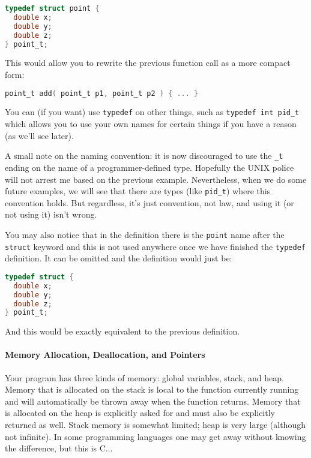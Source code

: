 \begin{lstlisting}[language=C]
typedef struct point {
  double x;
  double y;
  double z;
} point_t;
\end{lstlisting}

This would allow you to rewrite the previous function call as a more compact form:

\begin{lstlisting}[language=C]
point_t add( point_t p1, point_t p2 ) { ... }
\end{lstlisting}

You can (if you want) use \texttt{typedef} on other things, such as \texttt{typedef int pid\_t} which allows you to use your own names for certain things if you have a reason (as we'll see later).

A small note on the naming convention: it is now discouraged to use the \texttt{\_t} ending on the name of a programmer-defined type. Hopefully the UNIX police will not arrest me based on the previous example. Nevertheless, when we do some future examples, we will see that there are types (like \texttt{pid\_t}) where this convention holds. But regardless, it's just convention, not law, and using it (or not using it) isn't wrong.

You may also notice that in the definition there is the \texttt{point} name after the \texttt{struct} keyword and this is not used anywhere once we have finished the \texttt{typedef} definition. It can be omitted and the definition would just be:

\begin{lstlisting}[language=C]
typedef struct {
  double x;
  double y;
  double z;
} point_t;
\end{lstlisting}

And this would be exactly equivalent to the previous definition.

\paragraph{Memory Allocation, Deallocation, and Pointers}

Your program has three kinds of memory: global variables, stack, and heap. Memory that is allocated on the stack is local to the function currently running and will automatically be thrown away when the function returns. Memory that is allocated on the heap is explicitly asked for and must also be explicitly returned as well. Stack memory is somewhat limited; heap is very large (although not infinite). In some programming languages one may get away without knowing the difference, but this is C...

